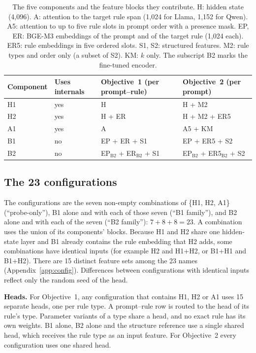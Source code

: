 \documentclass[10pt]{article}
\newcommand{\blk}[1]{\textsf{\small #1}}
\begin{document}
\begin{table}[t]
\centering\small
\caption{The five components and the feature blocks they contribute. \blk{H}: hidden state (4,096). \blk{A}: attention
to the target rule span (1,024 for Llama, 1,152 for Qwen). \blk{A5}: attention to up to five rule slots in prompt order
with a presence mask. \blk{EP}, \blk{ER}: BGE-M3 embeddings of the prompt and of the target rule (1,024 each).
\blk{ER5}: rule embeddings in five ordered slots. \blk{S1}, \blk{S2}: structured features. \blk{M2}: rule types and
order only (a subset of \blk{S2}). \blk{KM}: $k$ only. The subscript B2 marks the fine-tuned encoder.}
\label{tab:components}
\begin{tabular}{llll}
\toprule
Component & Uses internals & Objective~1 (per prompt--rule) & Objective~2 (per prompt) \\
\midrule
H1 & yes & \blk{H} & \blk{H} + \blk{M2} \\
H2 & yes & \blk{H} + \blk{ER} & \blk{H} + \blk{M2} + \blk{ER5} \\
A1 & yes & \blk{A} & \blk{A5} + \blk{KM} \\
B1 & no & \blk{EP} + \blk{ER} + \blk{S1} & \blk{EP} + \blk{ER5} + \blk{S2} \\
B2 & no & \blk{EP}$_\text{B2}$ + \blk{ER}$_\text{B2}$ + \blk{S1} & \blk{EP}$_\text{B2}$ + \blk{ER5}$_\text{B2}$ + \blk{S2} \\
\bottomrule
\end{tabular}
\end{table}

\subsection{The 23 configurations}

The configurations are the seven non-empty combinations of \{H1, H2, A1\} (``probe-only''), B1 alone and with each of
those seven (``B1 family''), and B2 alone and with each of the seven (``B2 family''): $7+8+8=23$. A combination uses
the union of its components' blocks. Because H1 and H2 share one hidden-state layer and B1 already contains the rule
embedding that H2 adds, some combinations have identical inputs (for example H2 and H1+H2, or B1+H1 and B1+H2). There
are 15 distinct feature sets among the 23 names (Appendix~\ref{app:config}). Differences between configurations with
identical inputs reflect only the random seed of the head.

\textbf{Heads.} For Objective~1, any configuration that contains H1, H2 or A1 uses 15 separate heads, one per rule
type. A prompt--rule row is routed to the head of its rule's type. Parameter variants of a type share a head, and no
exact rule has its own weights. B1 alone, B2 alone and the structure reference use a single shared head, which receives
the rule type as an input feature. For Objective~2 every configuration uses one shared head.
\end{document}
